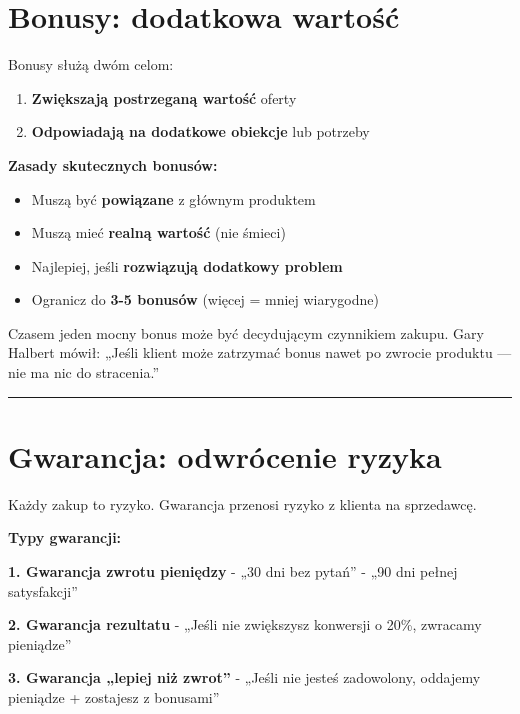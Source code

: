\documentclass[
  12pt,
  a4paper,
  twoside,
  openright,
  12pt,
  DIV=12,
  BCOR=12mm]{scrbook}
\providecommand{\tightlist}{%
  \setlength{\itemsep}{0pt}\setlength{\parskip}{0pt}}\usepackage{longtable,booktabs,array}
\newcommand{\decoline}{%
  \begin{center}
    \textcolor{bordergray}{\rule{0.3\textwidth}{0.5pt}}
  \end{center}
}
\begin{document}
\section{Bonusy: dodatkowa
wartość}\label{bonusy-dodatkowa-wartoux15bux107}

Bonusy służą dwóm celom:

\begin{enumerate}
\def\labelenumi{\arabic{enumi}.}
\tightlist
\item
  \textbf{Zwiększają postrzeganą wartość} oferty
\item
  \textbf{Odpowiadają na dodatkowe obiekcje} lub potrzeby
\end{enumerate}

\textbf{Zasady skutecznych bonusów:}

\begin{itemize}
\tightlist
\item
  Muszą być \textbf{powiązane} z głównym produktem
\item
  Muszą mieć \textbf{realną wartość} (nie śmieci)
\item
  Najlepiej, jeśli \textbf{rozwiązują dodatkowy problem}
\item
  Ogranicz do \textbf{3-5 bonusów} (więcej = mniej wiarygodne)
\end{itemize}

\begin{wskazowka}
Czasem jeden mocny bonus może być decydującym czynnikiem zakupu. Gary Halbert mówił: „Jeśli klient może zatrzymać bonus nawet po zwrocie produktu --- nie ma nic do stracenia.”
\end{wskazowka}

\decoline

\section{Gwarancja: odwrócenie
ryzyka}\label{gwarancja-odwruxf3cenie-ryzyka}

Każdy zakup to ryzyko. Gwarancja przenosi ryzyko z klienta na
sprzedawcę.

\textbf{Typy gwarancji:}

\textbf{1. Gwarancja zwrotu pieniędzy} - „30 dni bez pytań'' - „90 dni
pełnej satysfakcji''

\textbf{2. Gwarancja rezultatu} - „Jeśli nie zwiększysz konwersji o
20\%, zwracamy pieniądze''

\textbf{3. Gwarancja „lepiej niż zwrot''} - „Jeśli nie jesteś
zadowolony, oddajemy pieniądze + zostajesz z bonusami''
\end{document}
